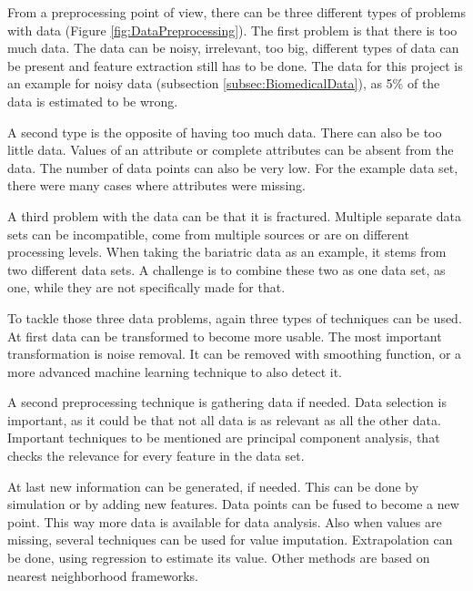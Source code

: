 \documentclass[10pt,a4paper]{article}
\begin{document}
 	From a preprocessing point of view, there can be three different types of problems with data (Figure \ref{fig:DataPreprocessing}). The first problem is that there is too much data. The data can be noisy, irrelevant, too big, different types of data can be present and feature extraction still has to be done. The data for this project is an example for noisy data (subsection \ref{subsec:BiomedicalData}), as 5\% of the data is estimated to be wrong.
 	
 	A second type is the opposite of having too much data. There can also be too little data. Values of an attribute or complete attributes can be absent from the data. The number of data points can also be very low. For the example data set, there were many cases where attributes were missing.
 	
	A third problem with the data can be that it is fractured. Multiple separate data sets can be incompatible, come from multiple sources or are on different processing levels. When taking the bariatric data as an example, it stems from two different data sets. A challenge is to combine these two as one data set, as one, while they are not specifically made for that.
 	
	To tackle those three data problems, again three types of techniques can be used. At first data can be transformed to become more usable. The most important transformation is noise removal. It can be removed with smoothing function\cite{somorjai2004data, karagiannis2011noise}, or a more advanced machine learning technique to also detect it.\cite{gamberger2000noise}
 	
 	A second preprocessing technique is gathering data if needed. Data selection is important, as it could be that not all data is as relevant as all the other data. Important techniques to be mentioned are principal component analysis, that checks the relevance for every feature in the data set.\cite{duszak1994using} 
 	
 	At last new information can be generated, if needed. This can be done by simulation or by adding new features. Data points can be fused to become a new point. This way more data is available for data analysis. Also when values are missing, several techniques can be used for value imputation. Extrapolation can be done, using regression to estimate its value. Other methods are based on nearest neighborhood frameworks.\cite{zhu2011missing} 
 	
\end{document}
